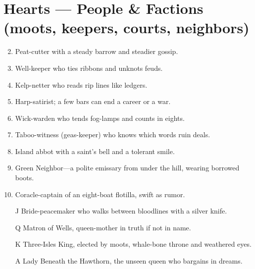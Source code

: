 \section*{Hearts --- People \& Factions (moots, keepers, courts, neighbors)}
\begin{enumerate}
\setcounter{enumi}{1}
\item Peat-cutter with a steady barrow and steadier gossip.
\item Well-keeper who ties ribbons and unknots feuds.
\item Kelp-netter who reads rip lines like ledgers.
\item Harp-satirist; a few bars can end a career or a war.
\item Wick-warden who tends fog-lamps and counts in eights.
\item Taboo-witness (geas-keeper) who knows which words ruin deals.
\item Island abbot with a saint's bell and a tolerant smile.
\item Green Neighbor---a polite emissary from under the hill, wearing borrowed boots.
\item Coracle-captain of an eight-boat flotilla, swift as rumor.
\item[J] Bride-peacemaker who walks between bloodlines with a silver knife.
\item[Q] Matron of Wells, queen-mother in truth if not in name.
\item[K] Three-Isles King, elected by moots, whale-bone throne and weathered eyes.
\item[A] Lady Beneath the Hawthorn, the unseen queen who bargains in dreams.
\end{enumerate}

